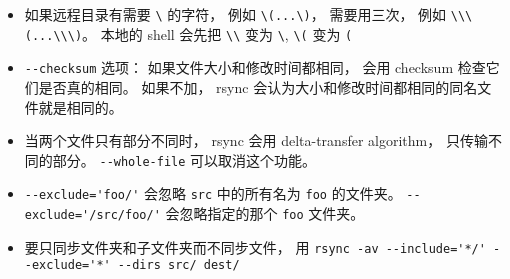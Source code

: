 \begin{itemize}
\item 如果远程目录有需要 \verb`\` 的字符， 例如 \verb`\(...\)`， 需要用三次， 例如 \verb`\\\(...\\\)`。 本地的 shell 会先把 \verb`\\` 变为 \verb`\`, \verb`\(` 变为 \verb`(`
\item \verb|--checksum| 选项： 如果文件大小和修改时间都相同， 会用 checksum 检查它们是否真的相同。 如果不加， rsync 会认为大小和修改时间都相同的同名文件就是相同的。
\item 当两个文件只有部分不同时， rsync 会用 delta-transfer algorithm， 只传输不同的部分。 \verb|--whole-file| 可以取消这个功能。
\item \verb`--exclude='foo/'` 会忽略 \verb`src` 中的所有名为 \verb`foo` 的文件夹。 \verb`--exclude='/src/foo/'` 会忽略指定的那个 \verb`foo` 文件夹。
\item 要只同步文件夹和子文件夹而不同步文件， 用 \verb`rsync -av --include='*/' --exclude='*' --dirs src/ dest/`
\end{itemize}

